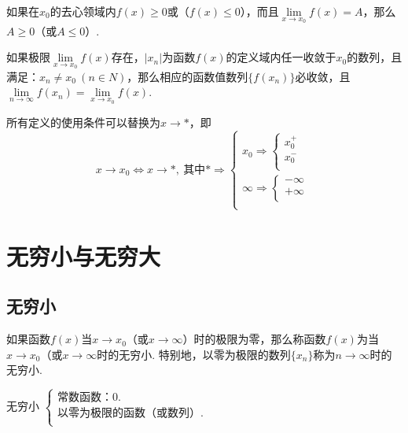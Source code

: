 \documentclass[lang=cn,10pt]{elegantbook}
\begin{document}
\begin{corollary}
	如果在\( x_{0} \)的去心领域内\( f(x) \geqslant 0 \)或（\( f(x) \leqslant 0 \)），而且\( \lim\limits_{x \to x_{0}}f(x) = A \)，那么\( A \geqslant 0 \)（或\( A \leqslant 0 \)）.
\end{corollary}

\begin{theorem}[函数极限与数列极限的关系]
	如果极限\( \lim\limits_{x \to x_{0}}f(x) \)存在，\( |x_{n}| \)为函数\( f(x) \)的定义域内任一收敛于\( x_{0} \)的数列，且满足：\( x_{n} \neq x_{0}\ (n \in N) \)，那么相应的函数值数列\( \{f(x_{n})\} \)必收敛，且\( \lim\limits_{n \to \infty}f(x_{n}) = \lim\limits_{x \to x_{0}}f(x) \).
\end{theorem}

\begin{note}
	所有定义的使用条件可以替换为\( x \to * \)，即\\
	\[ x \to x_{0} \Leftrightarrow x \to *,\ \text{其中}* \Rightarrow
	\begin{cases*}
		x_{0} \Rightarrow \begin{cases*}
			x_{0}^{+} \\
			x_{0}^{-} \\
		\end{cases*} \\
		\infty \Rightarrow \begin{cases*}
			-\infty \\
			+\infty \\
		\end{cases*} \\
	\end{cases*} \]
\end{note}

\section{无穷小与无穷大}
\subsection{无穷小}

\begin{definition}[无穷小]
	如果函数\( f(x) \)当\( x \to x_{0} \)（或\( x \to \infty \)）时的极限为零，那么称函数\( f(x) \)为当\( x \to x_{0} \)（或\( x \to \infty \)时的无穷小.
	特别地，以零为极限的数列\( \{x_{n}\} \)称为\( n \to \infty \)时的无穷小.
\end{definition}

\begin{note}
	无穷小
	\( \begin{cases}
		\text{常数函数：}0. \\
		\text{以零为极限的函数（或数列）}. \\
	\end{cases} \)
\end{note}
\end{document}
